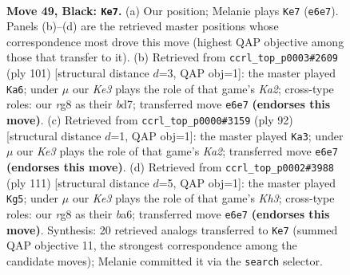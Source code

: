 \documentclass[11pt]{article}
\begin{document}
\clearpage

\begin{figure}[p]\centering
\begin{subfigure}{0.46\textwidth}\centering
\resizebox{\linewidth}{!}{%
\newchessgame
\chessboard[
  setfen={6R1/8/4k3/1pp5/4b3/8/8/5K2 b - - 3 49},
  showmover=false,
  pgfstyle=straightmove, color=movearrow, markmove={e6-e7}
]}
\caption{}
\end{subfigure}\hfill
\begin{subfigure}{0.46\textwidth}\centering
\resizebox{\linewidth}{!}{%
\newchessgame
\chessboard[
  setfen={8/k2B4/3p4/8/3p4/8/5K2/3b4 b - - 9 51},
  showmover=false,
  pgfstyle=straightmove, color=movearrow, markmove={a7-a6}
]}
\caption{}
\end{subfigure}
\\[4pt]
\begin{subfigure}{0.46\textwidth}\centering
\resizebox{\linewidth}{!}{%
\newchessgame
\chessboard[
  setfen={1B6/8/8/3P1k2/7r/8/K1P5/8 w - - 10 47},
  showmover=false,
  pgfstyle=straightmove, color=movearrow, markmove={a2-a3}
]}
\caption{}
\end{subfigure}\hfill
\begin{subfigure}{0.46\textwidth}\centering
\resizebox{\linewidth}{!}{%
\newchessgame
\chessboard[
  setfen={4b3/8/B6k/8/1K6/5p2/7P/8 b - - 1 56},
  showmover=false,
  pgfstyle=straightmove, color=movearrow, markmove={h6-g5}
]}
\caption{}
\end{subfigure}
\caption{\textbf{Move 49, Black: \texttt{Ke7}.} (a) Our position; Melanie plays \texttt{Ke7} (\texttt{e6e7}). Panels (b)--(d) are the retrieved master positions whose correspondence most drove this move (highest QAP objective among those that transfer to it). (b) Retrieved from \texttt{ccrl\_top\_p0003\#2609} (ply 101) [structural distance $d$=3, QAP obj=1]: the master played \texttt{Ka6}; under $\mu$ our \emph{Ke3} plays the role of that game's \emph{Ka2}; cross-type roles: our \emph{r}g8 as their \emph{b}d7; transferred move \texttt{e6e7} \textbf{(endorses this move)}. (c) Retrieved from \texttt{ccrl\_top\_p0000\#3159} (ply 92) [structural distance $d$=1, QAP obj=1]: the master played \texttt{Ka3}; under $\mu$ our \emph{Ke3} plays the role of that game's \emph{Ka2}; transferred move \texttt{e6e7} \textbf{(endorses this move)}. (d) Retrieved from \texttt{ccrl\_top\_p0002\#3988} (ply 111) [structural distance $d$=5, QAP obj=1]: the master played \texttt{Kg5}; under $\mu$ our \emph{Ke3} plays the role of that game's \emph{Kh3}; cross-type roles: our \emph{r}g8 as their \emph{b}a6; transferred move \texttt{e6e7} \textbf{(endorses this move)}. Synthesis: 20 retrieved analogs transferred to \texttt{Ke7} (summed QAP objective 11, the strongest correspondence among the candidate moves); Melanie committed it via the \texttt{search} selector.}
\label{fig:thought-m97}
\end{figure}
\end{document}
